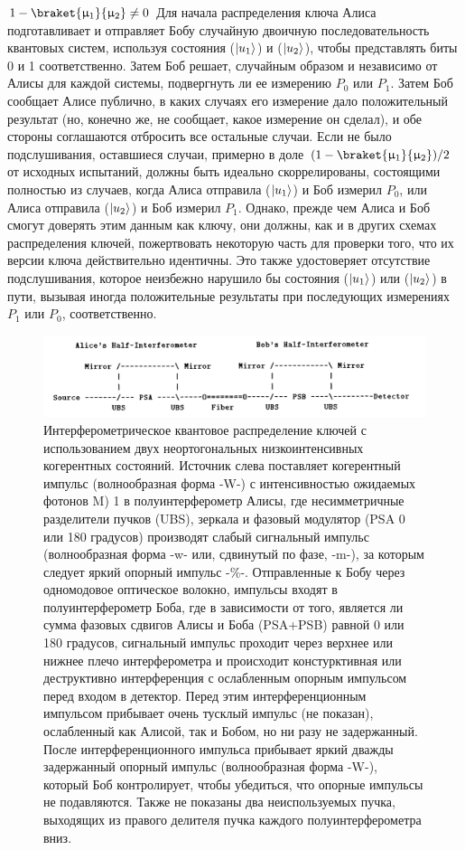 $1 -\braket{\mu_1}{\mu_2}\neq 0$
Для начала распределения ключа Алиса подготавливает и отправляет Бобу случайную двоичную последовательность квантовых систем, используя состояния ($\lvert u_1\rangle$) и ($\lvert u_2\rangle$), чтобы представлять биты 0 и 1 соответственно. Затем Боб решает, случайным образом и независимо от Алисы для каждой системы, подвергнуть ли ее измерению $P_0$ или $P_1$. Затем Боб сообщает Алисе публично, в каких случаях его измерение дало положительный результат (но, конечно же, не сообщает, какое измерение он сделал), и обе стороны соглашаются отбросить все остальные случаи. Если не было подслушивания, оставшиеся случаи, примерно в доле $(1 -\braket{\mu_1}{\mu_2})/2$ от исходных испытаний, должны быть идеально скоррелированы, состоящими полностью из случаев, когда Алиса отправила ($\lvert u_1\rangle$) и Боб измерил $P_0$, или Алиса отправила ($\lvert u_2\rangle$) и Боб измерил $P_1$. Однако, прежде чем Алиса и Боб смогут доверять этим данным как ключу, они должны, как и в других схемах распределения ключей, пожертвовать некоторую часть для проверки того, что их версии ключа действительно идентичны. Это также удостоверяет отсутствие подслушивания, которое неизбежно нарушило бы состояния ($\lvert u_1\rangle$) или ($\lvert u_2\rangle$) в пути, вызывая иногда положительные результаты при последующих измерениях $P_1$ или $P_0$, соответственно.
\begin{figure}
    \centering
    \includegraphics[width=\linewidth]{images/B92 scheme from article.png}
    \caption{Интерферометрическое квантовое распределение ключей с использованием двух неортогональных низкоинтенсивных когерентных состояний. Источник слева поставляет когерентный импульс (волнообразная форма -W-) с интенсивностью ожидаемых фотонов M) 1 в полуинтерферометр Алисы, где несимметричные разделители пучков (UBS), зеркала и фазовый модулятор (PSA 0 или 180 градусов) производят слабый сигнальный импульс (волнообразная форма -w- или, сдвинутый по фазе, -m-), за которым следует яркий опорный импульс -\%-. Отправленные к Бобу через одномодовое оптическое волокно, импульсы входят в полуинтерферометр Боба, где в зависимости от того, является ли сумма фазовых сдвигов Алисы и Боба (PSA+PSB) равной 0 или 180 градусов, сигнальный импульс проходит через верхнее  или нижнее плечо интерферометра и происходит констурктивная или деструктивно интерференция с ослабленным опорным импульсом перед входом в детектор. Перед этим интерференционным импульсом прибывает очень тусклый импульс (не показан), ослабленный как Алисой, так и Бобом, но ни разу не задержанный. После интерференционного импульса прибывает яркий дважды задержанный опорный импульс (волнообразная форма -W-), который Боб контролирует, чтобы убедиться, что опорные импульсы не подавляются. Также не показаны два неиспользуемых пучка, выходящих из правого делителя пучка  каждого полуинтерферометра вниз.}
    \label{fig:B92 sch lit}
\end{figure}
